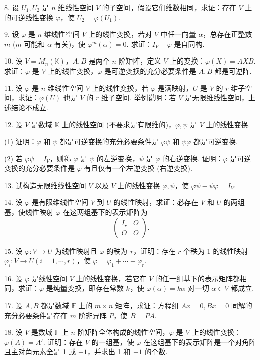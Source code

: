 \documentclass[UTF8,12pt,a4paper,fontset=fandol]{ctexart}
\begin{document}
8. 设 $U_1,U_2$ 是 $n$ 维线性空间 $V$ 的子空间，假设它们维数相同，求证：存在 $V$ 上的可逆线性变换 $\varphi$，使 $U_2=\varphi(U_1)$.

9. 设 $\varphi$ 是 $n$ 维线性空间 $V$ 上的线性变换，若对 $V$ 中任一向量 $\alpha$，总存在正整数 $m$ ($m$ 可能和 $\alpha$ 有关)，使 $\varphi^m(\alpha)=0$. 求证：$I_V-\varphi$ 是自同构.

10. 设 $V=M_n(\mathbb{K})$，$A,B$ 是两个 $n$ 阶矩阵，定义 $V$ 上的变换：$\varphi(X)=AXB$. 求证：$\varphi$ 是 $V$ 上的线性变换，$\varphi$ 是可逆变换的充分必要条件是 $A,B$ 都是可逆阵.

11. 设 $\varphi$ 是 $n$ 维线性空间 $V$ 上的线性变换，若 $\varphi$ 是满映射，$U$ 是 $V$ 的 $r$ 维子空间，求证：$\varphi(U)$ 也是 $V$ 的 $r$ 维子空间. 举例说明：若 $V$ 是无限维线性空间，上述结论不成立.

12. 设 $V$ 是数域 $\mathbb{K}$ 上的线性空间 (不要求是有限维的)，$\varphi,\psi$ 是 $V$ 上的线性变换.

(1) 证明：$\varphi$ 和 $\psi$ 都是可逆变换的充分必要条件是 $\varphi\psi$ 和 $\psi\varphi$ 都是可逆变换.

(2) 若 $\varphi\psi=I_V$，则称 $\varphi$ 是 $\psi$ 的左逆变换，$\psi$ 是 $\varphi$ 的右逆变换. 证明：$\varphi$ 是可逆变换的充分必要条件是 $\varphi$ 有且仅有一个左逆变换 (右逆变换).

13. 试构造无限维线性空间 $V$ 以及 $V$ 上的线性变换 $\varphi,\psi$，使 $\varphi\psi-\psi\varphi=I_V$.

14. 设 $\varphi$ 是有限维线性空间 $V$ 到 $U$ 的线性映射，求证：必存在 $V$ 和 $U$ 的两组基，使线性映射 $\varphi$ 在这两组基下的表示矩阵为
\[
\left(\begin{array}{cc}
I_r & O\\
O & O
\end{array}\right).
\]

15. 设 $\varphi:V\to U$ 为线性映射且 $\varphi$ 的秩为 $r$，证明：存在 $r$ 个秩为 1 的线性映射 $\varphi_i:V\to U(i=1,\cdots,r)$，使 $\varphi=\varphi_1+\cdots+\varphi_r$.

16. 设 $\varphi$ 是线性空间 $V$ 上的线性变换，若它在 $V$ 的任一组基下的表示矩阵都相同，求证：$\varphi$ 是纯量变换，即存在常数 $k$，使 $\varphi(\alpha)=k\alpha$ 对一切 $\alpha\in V$ 都成立.

17. 设 $A,B$ 都是数域 $\mathbb{F}$ 上的 $m\times n$ 矩阵，求证：方程组 $Ax=0,Bx=0$ 同解的充分必要条件是存在 $m$ 阶非异阵 $P$，使 $B=PA$.

18. 设 $V$ 是数域 $\mathbb{F}$ 上 $n$ 阶矩阵全体构成的线性空间，$\varphi$ 是 $V$ 上的线性变换：$\varphi(A)=A'$. 证明：存在 $V$ 的一组基，使 $\varphi$ 在这组基下的表示矩阵是一个对角阵且主对角元素全是 1 或 $-1$，并求出 1 和 $-1$ 的个数.
\end{document}
